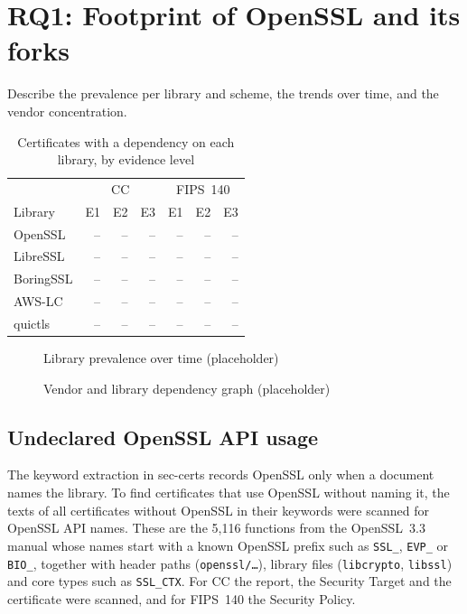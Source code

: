 \section{RQ1: Footprint of OpenSSL and its forks}
\label{sec:results-rq1}

{Describe the prevalence per library and scheme, the trends over time, and the
vendor concentration.}

\begin{table}[htbp]
  \centering
  \caption{Certificates with a dependency on each library, by evidence level}
  \label{tab:prevalence}
  \begin{tabular}{lrrrrrr}
    \toprule
    & \multicolumn{3}{c}{CC} & \multicolumn{3}{c}{FIPS~140} \\
    Library & E1 & E2 & E3 & E1 & E2 & E3 \\
    \midrule
    OpenSSL   & -- & -- & -- & -- & -- & -- \\
    LibreSSL  & -- & -- & -- & -- & -- & -- \\
    BoringSSL & -- & -- & -- & -- & -- & -- \\
    AWS-LC    & -- & -- & -- & -- & -- & -- \\
    quictls   & -- & -- & -- & -- & -- & -- \\
    \bottomrule
  \end{tabular}
\end{table}

\begin{figure}[htbp]
  \centering
  \caption{Library prevalence over time (placeholder)}
  \label{fig:prevalence}
\end{figure}

\begin{figure}[htbp]
  \centering
  \caption{Vendor and library dependency graph (placeholder)}
  \label{fig:graph}
\end{figure}

\subsection{Undeclared OpenSSL API usage}
\label{sec:results-api-detection}

The keyword extraction in sec-certs records OpenSSL only when a document names
the library. To find certificates that use OpenSSL without naming it, the texts
of all certificates without OpenSSL in their keywords were scanned for OpenSSL
API names. These are the 5,116 functions from the OpenSSL~3.3 manual whose
names start with a known OpenSSL prefix such as \texttt{SSL\_}, \texttt{EVP\_}
or \texttt{BIO\_}, together with header paths (\texttt{openssl/\dots}),
library files (\texttt{libcrypto}, \texttt{libssl}) and core types such as
\texttt{SSL\_CTX}. For CC the report, the Security Target and the certificate
were scanned, and for FIPS~140 the Security Policy.

